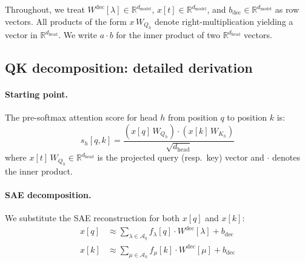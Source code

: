 \documentclass{article}
\theoremstyle{plain}
\theoremstyle{definition}
\theoremstyle{remark}
\newcommand{\Wdec}{W^{\mathrm{dec}}}
\newcommand{\dmodel}{d_{\mathrm{model}}}
\newcommand{\dhead}{d_{\mathrm{head}}}
\newcommand{\flambda}{f_\lambda}
\newcommand{\fmu}{f_\mu}
\newcommand{\RR}{\mathbb{R}}
\begin{document}
Throughout, we treat $\Wdec[\lambda] \in \RR^{\dmodel}$, $x[t] \in \RR^{\dmodel}$, and $b_{\mathrm{dec}} \in \RR^{\dmodel}$ as row vectors. All products of the form $x\,W_{Q_h}$ denote right-multiplication yielding a vector in $\RR^{\dhead}$. We write $a \cdot b$ for the inner product of two $\RR^{\dhead}$ vectors.

\subsection{QK decomposition: detailed derivation}
\label{app:qk_derivation}

\paragraph{Starting point.} The pre-softmax attention score for head $h$ from position $q$ to position $k$ is:
\begin{equation}
    s_h[q,k] = \frac{\left(x[q]\,W_{Q_h}\right) \cdot \left(x[k]\,W_{K_h}\right)}{\sqrt{\dhead}}
\end{equation}
where $x[t]\,W_{Q_h} \in \RR^{\dhead}$ is the projected query (resp.\ key) vector and $\cdot$ denotes the inner product.

\paragraph{SAE decomposition.} We substitute the SAE reconstruction for both $x[q]$ and $x[k]$:
\begin{align}
    x[q] &\approx \sum_{\lambda \in \mathcal{A}_q} \flambda[q] \cdot \Wdec[\lambda] + b_{\mathrm{dec}} \\
    x[k] &\approx \sum_{\mu \in \mathcal{A}_k} \fmu[k] \cdot \Wdec[\mu] + b_{\mathrm{dec}}
\end{align}
\end{document}

